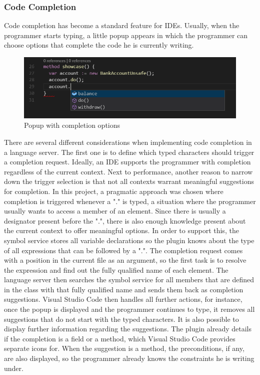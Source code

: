 \subsubsection{Code Completion} \label{codecompletion}
Code completion has become a standard feature for IDEs. Usually, when the programmer starts typing, a little popup appears in which the programmer can choose options that complete the code he is currently writing. \newline
\begin{figure}[H]
	\centering
	\includegraphics[width=1\textwidth]{img/codeCompletionOverview}
	\caption{Popup with completion options}
	\label{fig:codecompletionoverview}
\end{figure}
There are several different considerations when implementing code completion in a language server. The first one is to define which typed characters should trigger a completion request. Ideally, an IDE supports the programmer with completion regardless of the current context. Next to performance, another reason to narrow down the trigger selection is that not all contexts warrant meaningful suggestions for completion. In this project, a pragmatic approach was chosen where completion is triggered whenever a "." is typed, a situation where the programmer usually wants to access a member of an element. Since there is usually a designator present before the ".", there is also enough knowledge present about the current context to offer meaningful options. \newline
In order to support this, the symbol service stores all variable declarations so the plugin knows about the type of all expressions that can be followed by a ".". The completion request comes with a position in the current file as an argument, so the first task is to resolve the expression and find out the fully qualified name of each element. The language server then searches the symbol service for all members that are defined in the class with that fully qualified name and sends them back as completion suggestions. \newline
Visual Studio Code then handles all further actions, for instance, once the popup is displayed and the programmer continues to type, it removes all suggestions that do not start with the typed characters. It is also possible to display further information regarding the suggestions. The plugin already details if the completion is a field or a method, which Visual Studio Code provides  separate icons for. When the suggestion is a method, the preconditions, if any, are also displayed, so the programmer already knows the constraints he is writing under. \newline
